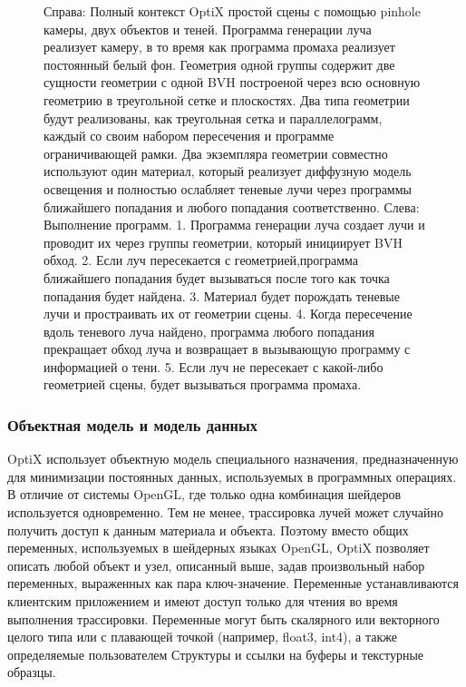 \begin{figure}[h!]
\caption{Справа: Полный контекст OptiX простой сцены с помощью pinhole камеры, двух объектов и теней.
Программа генерации луча реализует камеру, в то время как программа промаха реализует постоянный белый фон.
Геометрия одной группы содержит две сущности геометрии с одной BVH построеной через всю основную геометрию в треугольной сетке и плоскостях.
Два типа геометрии будут реализованы, как треугольная сетка и параллелограмм, каждый со своим набором пересечения и программе ограничивающей рамки.
Два экземпляра геометрии совместно используют один материал, который реализует диффузную модель освещения и полностью ослабляет теневые лучи через программы ближайшего попадания и любого попадания соответственно.
Слева: Выполнение программ. 1. Программа генерации луча создает лучи и проводит их через группы геометрии, который инициирует BVH обход.
2. Если луч пересекается с геометрией,программа ближайшего попадания будет вызываться после того как точка попадания будет найдена.
3. Материал будет порождать теневые лучи и простраивать их от геометрии сцены.
4. Когда пересечение вдоль теневого луча найдено, программа любого попадания прекращает обход луча и возвращает в вызывающую программу с информацией о тени.
5. Если луч не пересекает с какой-либо геометрией сцены, будет вызываться программа промаха.}
\label{fig1}
\end{figure}

\subsubsection {Объектная модель и модель данных}
OptiX использует объектную модель специального назначения, предназначенную для минимизации постоянных данных, используемых в программных операциях.
В отличие от системы OpenGL, где только одна комбинация шейдеров используется одновременно.
Тем не менее, трассировка лучей может случайно получить доступ к данным материала и объекта. Поэтому вместо общих переменных, используемых в шейдерных языках OpenGL, OptiX позволяет описать любой объект и узел, описанный выше, задав произвольный набор переменных, выраженных как пара ключ-значение.
Переменные устанавливаются клиентским приложением и имеют доступ только для чтения во время выполнения трассировки.
Переменные могут быть скалярного или векторного целого типа или с плавающей точкой (например, float3, int4), а также определяемые пользователем Структуры и ссылки на буферы и текстурные образцы.

